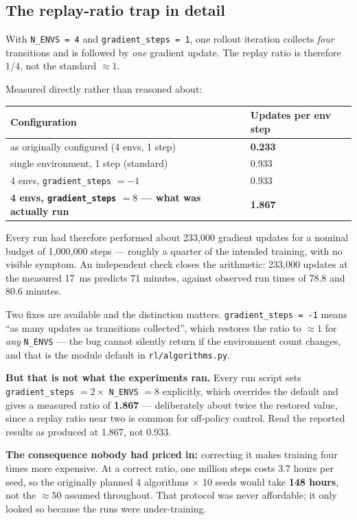 \subsection{The replay-ratio trap in detail}
\label{sec:defect5}

\begin{trap}
With \texttt{N\_ENVS = 4} and \texttt{gradient\_steps = 1}, one rollout iteration
collects \emph{four} transitions and is followed by \emph{one} gradient update.
The replay ratio is therefore $1/4$, not the standard $\approx 1$.

Measured directly rather than reasoned about:

\begin{center}
\begin{tabular}{@{} L{7.2cm} C{4.0cm} @{}}
\toprule
\textbf{Configuration} & \textbf{Updates per env step} \\
\midrule
as originally configured (4 envs, 1 step) & \textbf{0.233} \\
single environment, 1 step (standard) & 0.933 \\
4 envs, \texttt{gradient\_steps} $= -1$ & 0.933 \\
\textbf{4 envs, \texttt{gradient\_steps} $= 8$ --- what was actually run} & \textbf{1.867} \\
\bottomrule
\end{tabular}
\end{center}

Every run had therefore performed about 233{,}000 gradient updates for a nominal
budget of 1{,}000{,}000 steps --- roughly a quarter of the intended training,
with no visible symptom. An independent check closes the arithmetic: 233{,}000
updates at the measured \SI{17}{\milli\second} predicts 71 minutes, against
observed run times of 78.8 and 80.6 minutes.

Two fixes are available and the distinction matters. \texttt{gradient\_steps = -1}
means ``as many updates as transitions collected'', which restores the ratio to
$\approx 1$ for \emph{any} \texttt{N\_ENVS} --- the bug cannot silently return if
the environment count changes, and that is the module default in
\texttt{rl/algorithms.py}.

\textbf{But that is not what the experiments ran.} Every run script sets
\texttt{gradient\_steps} $= 2 \times$ \texttt{N\_ENVS} $= 8$ explicitly, which
overrides the default and gives a measured ratio of \textbf{1.867} --- deliberately
about twice the restored value, since a replay ratio near two is common for
off-policy control. Read the reported results as produced at 1.867, not 0.933.

\textbf{The consequence nobody had priced in:} correcting it makes training four
times more expensive. At a correct ratio, one million steps costs 3.7 hours per
seed, so the originally planned 4 algorithms $\times$ 10 seeds would take
\textbf{148 hours}, not the $\approx 50$ assumed throughout. That protocol was
never affordable; it only looked so because the runs were under-training.
\end{trap}

